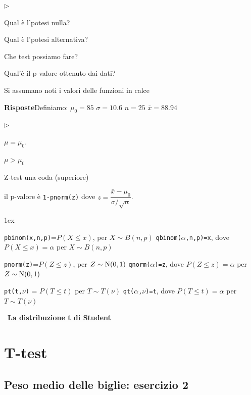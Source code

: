 \documentclass[11pt,openany]{book}
\newcommand{\mylabel}[1]{{\footnotesize\textsf{#1}}\hfill}
\renewenvironment{itemize}
  {\begin{list}{$\triangleright$}{%
   \setlength{\parskip}{0mm}
   \setlength{\topsep}{.2\baselineskip}
   \setlength{\rightmargin}{0mm}
   \setlength{\listparindent}{0mm}
   \setlength{\itemindent}{0mm}
   \setlength{\labelwidth}{3ex}
   \setlength{\itemsep}{.4\baselineskip}
   \setlength{\parsep}{0mm}
   \setlength{\partopsep}{0mm}
   \setlength{\labelsep}{1ex}
   \setlength{\leftmargin}{\labelwidth+\labelsep}
   \let\makelabel\mylabel}}{%
   \end{list}\vspace*{-1.3mm}}
\begin{document}
\begin{itemize}
\item[1.] Qual è l'potesi nulla?

\item[2.] Qual è l'potesi alternativa?

\item[3.] Che test possiamo fare?

\item[4.] Qual'è il p-valore ottenuto dai dati?
\end{itemize}

Si assumano noti i valori delle funzioni in calce

\textbf{Risposte}\quad Definiamo:\quad
$\mu_0=85$\quad
$\sigma=10.6$\quad
$n=25$\quad
$\bar x=88.94$
\begin{itemize}
\item[1.] $\mu=\mu_0$.
\item[2.] $\mu>\mu_0$ 
\item[3.] Z-test una coda (superiore)
\item[4.] il p-valore è {\tt 1-pnorm(z)} dove $z=\dfrac{\bar x-\mu_0}{\sigma/\sqrt{n}}$.
\end{itemize}

\vfill
\parskip1ex
{\hrulefill\scriptsize


{\tt pbinom(x,n,p)}=$P(X\le x)$, per $X\sim B(n,p)$
\hfill 
{\tt qbinom($\alpha$,n,p)=x},  dove $P(X\le x)=\alpha$ per $X\sim B(n,p)$

{\tt pnorm(z)}=$P(Z\le z)$, per $Z\sim {\rm N}(0,1)$
\hfill 
{\tt qnorm($\alpha$)=z},  dove $P(Z\le z)=\alpha$ per $Z\sim {\rm N}(0,1)$

{\tt pt(t,$\nu$)} = $P(T\le t)$ per $T\sim T(\nu)$
\hfill
{\tt qt($\alpha$,$\nu$)=t}, dove $P(T\le t)=\alpha$ per $T\sim T(\nu)$

}



\clearpage\ 
\hfill\textbf{{\color{brown}\hyperref[tStudent]{La distribuzione t di Student \faShare}}}
\section{T-test}
\label{T-test}

\subsection{Peso medio delle biglie: esercizio 2}
\end{document}
